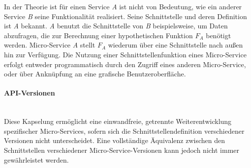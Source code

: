 In der Theorie ist für einen Service \textit{A} ist nicht von Bedeutung, wie ein anderer Service \textit{B} seine Funktionalität realisiert. Seine Schnittstelle und deren Definition ist \textit{A} bekannt. \textit{A} benutzt die Schnittstelle von \textit{B} beispielsweise, um Daten abzufragen, die zur Berechnung einer hypothetischen Funktion $F_A$ benötigt werden. Micro-Service \textit{A} stellt $F_A$ wiederum über eine Schnittstelle nach außen hin zur Verfügung. Die Nutzung einer Schnittstellenfunktion eines Micro-Service erfolgt entweder programmatisch durch den Zugriff eines anderen Micro-Service, oder über Anknüpfung an eine grafische Benutzeroberfläche.
\\

\paragraph{API-Versionen}\mbox{}\\

Diese Kapselung ermöglicht eine einwandfreie, getrennte Weiterentwicklung spezifischer Micro-Services, sofern sich die Schnittstellendefinition verschiedener Versionen nicht unterscheidet. Eine vollständige Äquivalenz zwischen den Schnittstellen verschiedener Micro-Service-Versionen kann jedoch nicht immer gewährleistet werden. 

